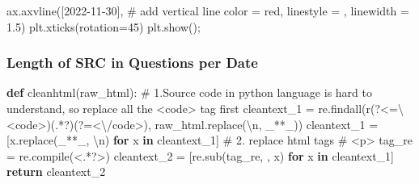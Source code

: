 \documentclass[
  letterpaper,
  DIV=11,
  numbers=noendperiod]{scrartcl}
\newenvironment{Shaded}{\begin{snugshade}}{\end{snugshade}}
\newcommand{\BuiltInTok}[1]{\textcolor[rgb]{0.00,0.23,0.31}{#1}}
\newcommand{\CharTok}[1]{\textcolor[rgb]{0.13,0.47,0.30}{#1}}
\newcommand{\CommentTok}[1]{\textcolor[rgb]{0.37,0.37,0.37}{#1}}
\newcommand{\ControlFlowTok}[1]{\textcolor[rgb]{0.00,0.23,0.31}{\textbf{#1}}}
\newcommand{\DecValTok}[1]{\textcolor[rgb]{0.68,0.00,0.00}{#1}}
\newcommand{\FloatTok}[1]{\textcolor[rgb]{0.68,0.00,0.00}{#1}}
\newcommand{\KeywordTok}[1]{\textcolor[rgb]{0.00,0.23,0.31}{\textbf{#1}}}
\newcommand{\NormalTok}[1]{\textcolor[rgb]{0.00,0.23,0.31}{#1}}
\newcommand{\OperatorTok}[1]{\textcolor[rgb]{0.37,0.37,0.37}{#1}}
\newcommand{\StringTok}[1]{\textcolor[rgb]{0.13,0.47,0.30}{#1}}
\newcommand{\VerbatimStringTok}[1]{\textcolor[rgb]{0.13,0.47,0.30}{#1}}
\begin{document}
\begin{Shaded}
\begin{Highlighting}[]
\NormalTok{ax.axvline([}\StringTok{\textquotesingle{}2022{-}11{-}30\textquotesingle{}}\NormalTok{], }\CommentTok{\# add vertical line}
\NormalTok{           color }\OperatorTok{=} \StringTok{\textquotesingle{}red\textquotesingle{}}\NormalTok{,}
\NormalTok{           linestyle }\OperatorTok{=} \StringTok{\textquotesingle{}{-}{-}\textquotesingle{}}\NormalTok{,}
\NormalTok{           linewidth }\OperatorTok{=} \FloatTok{1.5}\NormalTok{)}
\NormalTok{plt.xticks(rotation}\OperatorTok{=}\DecValTok{45}\NormalTok{)}
\NormalTok{plt.show()}\OperatorTok{;}





\end{Highlighting}
\end{Shaded}

\subsubsection{Length of SRC in Questions per
Date}\label{length-of-src-in-questions-per-date}

\begin{Shaded}
\begin{Highlighting}[]
\KeywordTok{def}\NormalTok{ cleanhtml(raw\_html):}
  \CommentTok{\# 1.Source code in python language is hard to understand, so replace all the \textless{}code\textgreater{} tag first}
\NormalTok{  cleantext\_1 }\OperatorTok{=}\NormalTok{ re.findall(}\VerbatimStringTok{r\textquotesingle{}(?\textless{}=\textbackslash{}\textless{}code\textgreater{})(.*?)(?=\textless{}\textbackslash{}/code\textgreater{})\textquotesingle{}}\NormalTok{, raw\_html.replace(}\StringTok{\textquotesingle{}}\CharTok{\textbackslash{}n}\StringTok{\textquotesingle{}}\NormalTok{, }\StringTok{\textquotesingle{}\_**\_\textquotesingle{}}\NormalTok{))}
\NormalTok{  cleantext\_1 }\OperatorTok{=}\NormalTok{ [x.replace(}\StringTok{\textquotesingle{}\_**\_\textquotesingle{}}\NormalTok{, }\StringTok{\textquotesingle{}}\CharTok{\textbackslash{}n}\StringTok{\textquotesingle{}}\NormalTok{) }\ControlFlowTok{for}\NormalTok{ x }\KeywordTok{in}\NormalTok{ cleantext\_1]}
  \CommentTok{\# 2. replace html tags}
  \CommentTok{\# \textless{}p\textgreater{}}
\NormalTok{  tag\_re }\OperatorTok{=}\NormalTok{ re.}\BuiltInTok{compile}\NormalTok{(}\StringTok{\textquotesingle{}\textless{}.*?\textgreater{}\textquotesingle{}}\NormalTok{)}
\NormalTok{  cleantext\_2 }\OperatorTok{=}\NormalTok{ [re.sub(tag\_re, }\StringTok{\textquotesingle{}\textquotesingle{}}\NormalTok{, x) }\ControlFlowTok{for}\NormalTok{ x }\KeywordTok{in}\NormalTok{ cleantext\_1]}
  \ControlFlowTok{return}\NormalTok{ cleantext\_2}
\end{Highlighting}
\end{Shaded}
\end{document}
